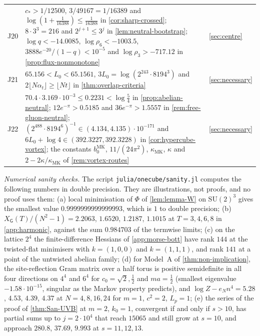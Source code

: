\documentclass[11pt,a4paper]{amsart}
\theoremstyle{definition}
\theoremstyle{remark}
\numberwithin{equation}{section}
\newcommand{\SU}{\mathrm{SU}}              %
\newcommand{\TT}{\mathbb{T}}               %
\newcommand{\Zc}{\mathcal{Z}}              %
\newcommand{\XT}[2]{X_{#1}(#2)}            %
\newcommand{\Gharm}{\mathsf{G}}            %
\newcommand{\Lp}{L_p}                      %
\begin{document}
{\begin{longtable}{@{}p{}p{}p{}@{}}
J20 & $c_*>1/12500$, $3/49167=1/16389$ and $\log(1+\frac1{16388})\le\frac1{16388}$ in \cref{cor:sharp-crossed}; $8\cdot3^3=216$ and $2^{j+1}\le3^j$ in \cref{lem:neutral-bootstrap}; $\log q<-14.0085$, $\log\rho_6<-1003.5$, $3888e^{-20}/(1-q)<10^{-5}$ and $\log\rho_3>-717.12$ in \cref{prop:flux-nonmonotone} & \cref{sec:centre}\\
J21 & $65.156<L_0<65.1561$, $3L_0=\log(2^{243}\cdot8194^3)$ and $2\lfloor N\alpha_t\rfloor\ge\lfloor Nt\rfloor$ in \cref{thm:overlap-criteria} & \cref{sec:necessary}\\
J22 & $70.4\cdot3.169\cdot10^{-3}\le0.2231<\log\frac54$ in \cref{prop:abelian-neutral}; $12e^{-\pi}>0.5185$ and $36e^{-\pi}>1.5557$ in \cref{rem:free-gluon-neutral}; $(2^{488}\cdot8194^6)^{-1}\in(4.134,4.135)\cdot10^{-171}$ and $6L_0+\log4\in(392.3227,392.3228)$ in \cref{cor:hypercube-vortex}; the constants $b_0^{\mathrm{MK}}$, $11/(24\pi^2)$, $\kappa_{\mathrm{MK}}$, $\kappa$ and $2-2\kappa/\kappa_{\mathrm{MK}}$ of \cref{rem:vortex-routes} & \cref{sec:necessary}\\
\end{longtable}}

\emph{Numerical sanity checks.} The script \texttt{julia/onecube/sanity.jl} computes the following numbers in double precision. They are illustrations, not proofs, and no proof uses them: (a) local minimisation of $\Phi$ of \cref{lem:lemma-W} on $\SU(2)^3$ gives the smallest value $0.9999999999999993$, which is $1$ to double precision; (b) $\XT{\Gharm}{T}/(N^2-1)=2.2063$, $1.6520$, $1.2187$, $1.1015$ at $T=3,4,6,8$ in \cref{app:harmonic}, against the sum $0.984703$ of the termwise limits; (c) on the lattice $2^4$ the finite-difference Hessians of \cref{app:morse-bott} have rank $144$ at the twisted-flat minimisers with $k=(1,0,0)$ and $k=(1,1,1)$, and rank $141$ at a point of the untwisted abelian family; (d) for Model~A of \cref{thm:non-implication}, the site-reflection Gram matrix over a half torus is positive semidefinite in all four directions on $4^4$ and $6^4$ for $c_0=\sqrt2,\frac12$ and $ma=\frac12$ (smallest eigenvalue $-1.58\cdot10^{-15}$, singular as the Markov property predicts), and $\log Z-e_Nn^4=5.28$, $4.53$, $4.39$, $4.37$ at $N=4,8,16,24$ for $m=1$, $c^2=2$, $\Lp=1$; (e) the series of the proof of \cref{thm:San-UVB} at $m=2$, $k_0=1$, convergent if and only if $s>10$, has partial sums up to $j=2\cdot10^4$ that reach $15065$ and still grow at $s=10$, and approach $280.8$, $37.69$, $9.993$ at $s=11,12,13$.
\end{document}
